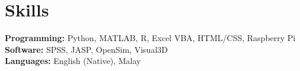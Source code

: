 \documentclass[../main.tex]{subfiles}
\begin{document}
\section{Skills}
  \vspace{2pt}
  \resumeSubHeadingListStart
    {\item{
        \textbf{Programming: }{Python, MATLAB, R, Excel VBA, HTML/CSS, Raspberry Pi} \\ \vspace{2pt}
        \textbf{Software: }{SPSS, JASP, OpenSim, Visual3D} \\ \vspace{2pt}
        \textbf{Languages: }{English (Native), Malay} \\ \vspace{2pt}
        
    }}
  \resumeSubHeadingListEnd
\end{document}
